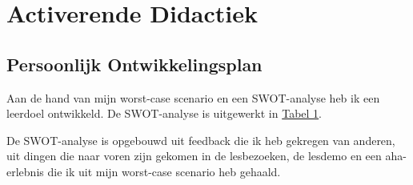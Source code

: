 
\section{Activerende Didactiek}
\subsection{Persoonlijk Ontwikkelingsplan}
\label{sec:didactiek}

Aan de hand van mijn worst-case scenario en een SWOT-analyse heb ik een leerdoel ontwikkeld. De SWOT-analyse is uitgewerkt in \hyperref[tab:SWOTDidactiek]{Tabel 1}.

De SWOT-analyse is opgebouwd uit feedback die ik heb gekregen van anderen, uit dingen die naar voren zijn gekomen in de lesbezoeken, de lesdemo en een aha-erlebnis die ik uit mijn worst-case scenario heb gehaald.


